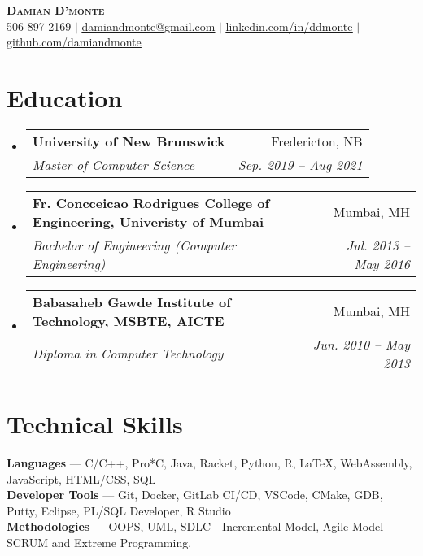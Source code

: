 \documentclass[letterpaper,10pt]{article}
\makeatletter
\newcommand{\resumeSubheading}[4]{
  \vspace{-2pt}\item
    \begin{tabular*}{0.97\textwidth}[t]{l@{\extracolsep{\fill}}r}
      \textbf{#1} & #2 \\
      \textit{\small#3} & \textit{\small #4} \\
    \end{tabular*}\vspace{-7pt}
}
\newcommand{\resumeSubHeadingListStart}{\begin{itemize}[leftmargin=0.15in, label={}]}
\newcommand{\resumeSubHeadingListEnd}{\end{itemize}}
\makeatother
\begin{document}

\begin{center}
    \textbf{\Huge \scshape Damian D'monte} \\ \vspace{4pt}
    \small 506-897-2169 $|$ \href{mailto:x@x.com}{\underline{damiandmonte@gmail.com}} $|$ 
    \href{https://linkedin.com/in/...}{\underline{linkedin.com/in/ddmonte}} $|$
    \href{https://github.com/...}{\underline{github.com/damiandmonte}}
\end{center}


\section{Education}
  \resumeSubHeadingListStart
    \resumeSubheading
      {University of New Brunswick}{Fredericton, NB}
      {Master of Computer Science}{Sep. 2019 -- Aug 2021}
    \resumeSubheading
      {Fr. Concceicao Rodrigues College of Engineering, Univeristy of Mumbai}{Mumbai, MH}
      {Bachelor of Engineering (Computer Engineering) }{Jul. 2013 -- May 2016}
    \resumeSubheading
      {Babasaheb Gawde Institute of Technology, MSBTE, AICTE }{Mumbai, MH}
      {Diploma in Computer Technology}{Jun. 2010 -- May 2013}
  \resumeSubHeadingListEnd


%
\section{Technical Skills}
 \begin{itemize}[leftmargin=0.15in, label={}]
    \small{\item{
     \textbf{Languages}{ --- C/C++, Pro*C, Java, Racket, Python, R, \LaTeX{}, WebAssembly, JavaScript, HTML/CSS, SQL} \\
     \textbf{Developer Tools}{ --- Git, Docker, GitLab CI/CD, VSCode, CMake, GDB, Putty, Eclipse, PL/SQL Developer, R Studio} \\
     \textbf{Methodologies}{ --- OOPS, UML, SDLC - Incremental Model, Agile Model - SCRUM and Extreme Programming.}
    }}
 \end{itemize}
\end{document}
